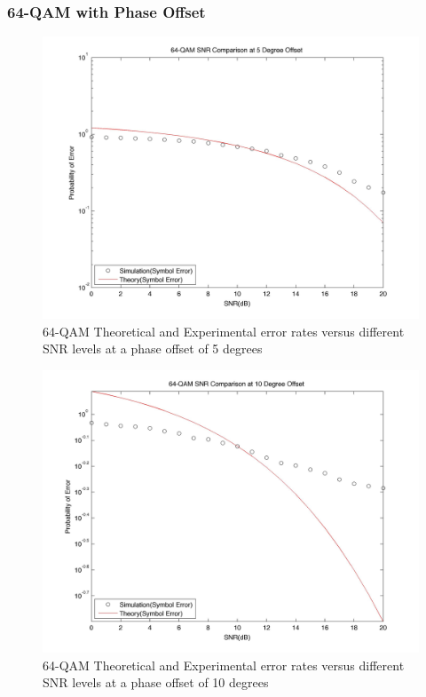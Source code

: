 \documentclass[]{article}
\begin{document}
\subsubsection{64-QAM with Phase Offset}
\label{qam64_phase}
\begin{figure}[H]
\centering
\hspace*{-2cm}\includegraphics[width=1.3\textwidth]{qam64SNRpo1.jpg}
\caption{64-QAM Theoretical and Experimental error rates versus different SNR levels at a phase offset of 5 degrees }
\end{figure}

\begin{figure}[H]
\centering
\hspace*{-2cm}\includegraphics[width=1.3\textwidth]{qam64SNRpo2.jpg}
\caption{64-QAM Theoretical and Experimental error rates versus different SNR levels at a phase offset of 10 degrees }
\end{figure}
\end{document}
